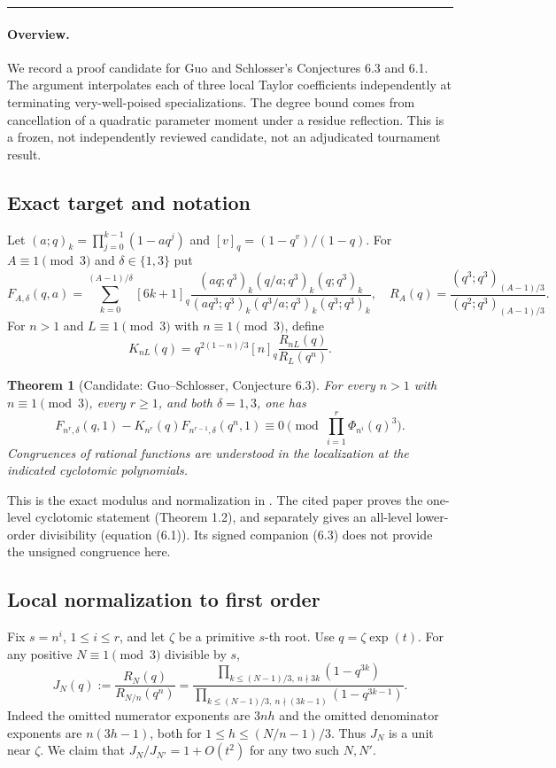 \documentclass[11pt,a4paper]{article}
\newtheorem{SourceRbiTtheorem}{Theorem}
\begin{document}
\smallskip\hrule\medskip



\begingroup
\newcommand{\Zp}{\mathbb Z_p}
\newcommand{\ord}{\operatorname{ord}}
\newcommand{\cut}{\delta}
\setcounter{equation}{0}
\renewcommand{\theequation}{\thesection.\arabic{equation}}
\renewcommand{\theHequation}{R18T.\arabic{equation}}
\paragraph{Overview.}
We record a proof candidate for Guo and Schlosser's Conjectures 6.3
and 6.1. The argument interpolates each of three local Taylor
coefficients independently at terminating very-well-poised
specializations. The degree bound comes from cancellation of a
quadratic parameter moment under a residue reflection. This is a
frozen, not independently reviewed candidate, not an adjudicated
tournament result.


\subsection{Exact target and notation}
Let \((a;q)_k=\prod_{j=0}^{k-1}(1-aq^j)\) and \([v]_q=(1-q^v)/(1-q)\).
For \(A\equiv1\pmod3\) and \(\cut\in\{1,3\}\) put
\[
 F_{A,\cut}(q,a)=\sum_{k=0}^{(A-1)/\cut}
 [6k+1]_q\frac{(aq;q^3)_k(q/a;q^3)_k(q;q^3)_k}
 {(aq^3;q^3)_k(q^3/a;q^3)_k(q^3;q^3)_k},
 \quad R_A(q)=\frac{(q^3;q^3)_{(A-1)/3}}{(q^2;q^3)_{(A-1)/3}}.
\]
For \(n>1\) and \(L\equiv1\pmod3\) with \(n\equiv1\pmod3\), define
\[
 K_{nL}(q)=q^{2(1-n)/3}[n]_q\frac{R_{nL}(q)}{R_L(q^n)}.
\]
\begin{SourceRbiTtheorem}[Candidate: Guo--Schlosser, Conjecture 6.3]
For every \(n>1\) with \(n\equiv1\pmod3\), every \(r\ge1\), and both
\(\cut=1,3\), one has
\[
 F_{n^r,\cut}(q,1)-K_{n^r}(q)F_{n^{r-1},\cut}(q^n,1)
 \equiv0\pmod{\prod_{i=1}^r\Phi_{n^i}(q)^3}.
\]
Congruences of rational functions are understood in the localization
at the indicated cyclotomic polynomials.
\end{SourceRbiTtheorem}
This is the exact modulus and normalization in \cite[Conjecture 6.3]{R18T:GS}.
The cited paper proves the one-level cyclotomic statement (Theorem 1.2),
and separately gives an all-level lower-order divisibility (equation (6.1)).
Its signed companion (6.3) does not provide the unsigned congruence here.

\subsection{Local normalization to first order}
Fix \(s=n^i\), \(1\le i\le r\), and let \(\zeta\) be a primitive \(s\)-th root.
Use \(q=\zeta\exp(t)\). For any positive \(N\equiv1\pmod3\) divisible by \(s\),
\[
 J_N(q):=\frac{R_N(q)}{R_{N/n}(q^n)}
   =\frac{\prod_{k\le (N-1)/3,\ n\nmid 3k}(1-q^{3k})}
          {\prod_{k\le (N-1)/3,\ n\nmid (3k-1)}(1-q^{3k-1})}.
\]
Indeed the omitted numerator exponents are \(3nh\) and the omitted
denominator exponents are \(n(3h-1)\), both for
\(1\le h\le (N/n-1)/3\). Thus \(J_N\) is a unit near \(\zeta\).
We claim that \(J_N/J_{N'}=1+O(t^2)\) for any two such \(N,N'\).
\end{document}
